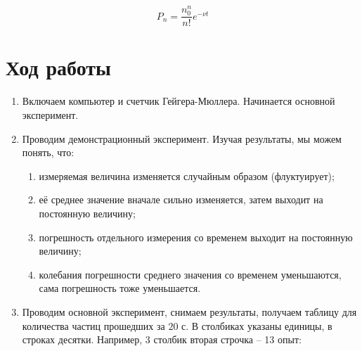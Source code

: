 \documentclass[a4paper, 12pt]{article}
\begin{document}
	\begin{equation}
		P_n = \frac{n_0^n}{n!}e^{-\nu t}
	\end{equation}
	
	\section{Ход работы}
	
	\begin{enumerate}
		\item Включаем компьютер и счетчик Гейгера-Мюллера. Начинается основной эксперимент.
		\item Проводим демонстрационный эксперимент. Изучая результаты, мы можем понять, что:
		\begin{enumerate}
			\item измеряемая величина изменяется случайным образом (флуктуирует);
			\item её среднее значение вначале сильно изменяется, затем выходит на постоянную величину;
			\item погрешность отдельного измерения со временем выходит на постоянную величину;
			\item колебания погрешности среднего значения со временем уменьшаются, сама погрешность тоже уменьшается.
		\end{enumerate}
		\item Проводим основной эксперимент, снимаем результаты, получаем таблицу для количества частиц прошедших за $20$ с. В столбиках указаны единицы, в строках десятки. Например, 3 столбик вторая строчка -- 13 опыт:
		

\end{enumerate}
\end{document}
